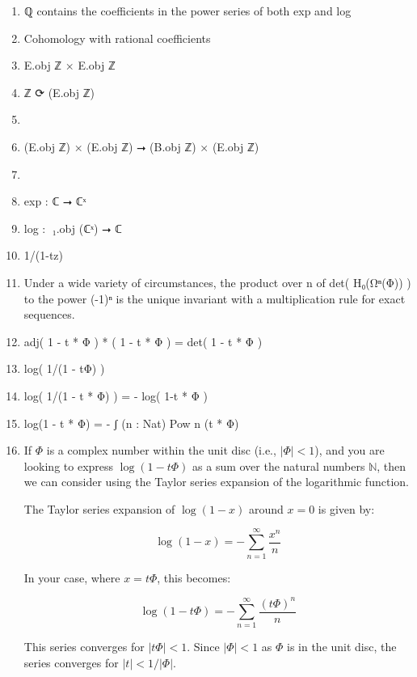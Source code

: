 \documentclass{book}
\begin{document}
\begin{enumerate}
\item ℚ contains the coefficients in the power series of both exp and log
\item Cohomology with rational coefficients
\item E.obj ℤ × E.obj ℤ
\item ℤ ⟳ (E.obj ℤ)
\item 
\item (E.obj ℤ) × (E.obj ℤ) ⭢ (B.obj ℤ) × (E.obj ℤ)
\item 
\item exp : ℂ ⭢ ℂˣ
\item log : π⃡₁.obj (ℂˣ) ⭢ ℂ
\item 1/(1-tz)
\item Under a wide variety of circumstances, the product over n of det( H₀(Ωⁿ(Φ)) ) to the power (-1)ⁿ is the unique invariant with a multiplication rule for exact sequences.
\item adj( 1 - t * Φ ) * ( 1 - t * Φ ) = det( 1 - t * Φ )
\item log( 1/(1 - tΦ) )
\item log( 1/(1 - t * Φ) ) = - log( 1-t * Φ ) 
\item log(1 - t * Φ) = - ʃ (n : Nat)  Pow n (t * Φ)
\item \iffalse If \(\Phi\) is a complex number within the unit disc (i.e., \(|\Phi| < 1\)), and you are looking to express \(\log(1 - t\Phi)\) as a sum over the natural numbers \(ℕ\), then we can consider using the Taylor series expansion of the logarithmic function.

The Taylor series expansion of \(\log(1 - x)\) around \(x = 0\) is given by:

\[
\log(1 - x) = -\sum_{n=1}^{\infty} \frac{x^n}{n}
\]

In your case, where \(x = t\Phi\), this becomes:

\[
\log(1 - t\Phi) = -\sum_{n=1}^{\infty} \frac{(t\Phi)^n}{n}
\]

This series converges for \(|t\Phi| < 1\). Since \(|\Phi| < 1\) as \(\Phi\) is in the unit disc, the series converges for \(|t| < 1/|\Phi|\).\\


\end{enumerate}
\end{document}
